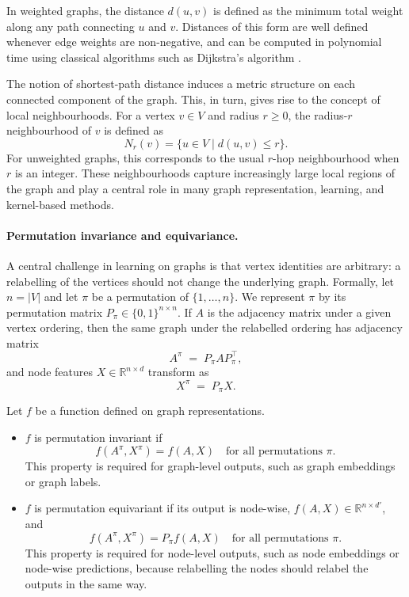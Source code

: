 In weighted graphs, the distance $d(u,v)$ is defined as the minimum total weight
along any path connecting $u$ and $v$. Distances of this form are well defined
whenever edge weights are non-negative, and can be computed in polynomial time
using classical algorithms such as Dijkstra's algorithm \citep{dijkstra1959note}.


The notion of shortest-path distance induces a metric structure on each
connected component of the graph. This, in turn, gives rise to the concept of
local neighbourhoods. For a vertex $v \in V$ and radius $r \geq 0$, the radius-$r$ neighbourhood of $v$ is defined as
\[
N_r(v)=\{u \in V \mid d(u,v) \leq r\}.
\]
For unweighted graphs, this corresponds to the usual $r$-hop neighbourhood when
$r$ is an integer.
These neighbourhoods capture increasingly large local regions of the graph and
play a central role in many graph representation, learning, and kernel-based
methods.
\paragraph{Permutation invariance and equivariance.}
A central challenge in learning on graphs is that vertex identities are
arbitrary: a relabelling of the vertices should not change the underlying
graph. Formally, let $n=|V|$ and let $\pi$ be a permutation of $\{1,\dots,n\}$.
We represent $\pi$ by its permutation matrix $P_\pi\in\{0,1\}^{n\times n}$.
If $A$ is the adjacency matrix under a given vertex ordering, then the same
graph under the relabelled ordering has adjacency matrix
\[
A^\pi \;=\; P_\pi A P_\pi^\top,
\]
and node features $X\in\mathbb{R}^{n\times d}$ transform as
\[
X^\pi \;=\; P_\pi X.
\]

\begin{definition}
Let $f$ be a function defined on graph representations.

\begin{itemize}
    \item $f$ is permutation invariant if
    \[
    f(A^\pi, X^\pi) = f(A,X)
    \quad \text{for all permutations } \pi .
    \]
    This property is required for graph-level outputs, such as graph embeddings
    or graph labels.

    \item $f$ is permutation equivariant if its output is node-wise,
    $f(A,X) \in \mathbb{R}^{n \times d'}$, and
    \[
    f(A^\pi, X^\pi) = P_\pi f(A,X)
    \quad \text{for all permutations } \pi .
    \]
    This property is required for node-level outputs, such as node embeddings
    or node-wise predictions, because relabelling the nodes should relabel the
    outputs in the same way.
\end{itemize}
\end{definition}

